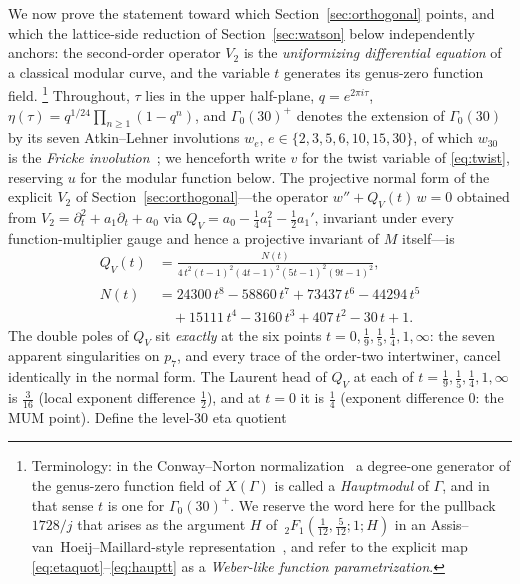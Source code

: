 \documentclass[cntp]{ipart}
\theoremstyle{plain}
\theoremstyle{remark}
\begin{document}
We now prove the statement toward which Section~\ref{sec:orthogonal} points, and which the lattice-side
reduction of Section~\ref{sec:watson} below independently anchors: the second-order
operator $V_2$ is the \emph{uniformizing differential equation} of a classical modular curve, and the variable
$t$ generates its genus-zero function field.%
\footnote{Terminology: in the Conway--Norton normalization~\cite{ConwayNorton1979} a degree-one generator of
the genus-zero function field of $X(\Gamma)$ is called a \emph{Hauptmodul} of $\Gamma$, and in that sense $t$
is one for $\Gamma_0(30)^+$. We reserve the word here for the pullback $1728/j$ that arises as the argument $H$
of $\,_2F_1\!\left(\tfrac1{12},\tfrac5{12};1;H\right)$ in an
Assis--van~Hoeij--Maillard-style representation~\cite{AVM2016}, and refer to the explicit
map \eqref{eq:etaquot}--\eqref{eq:hauptt} as a \emph{Weber-like function parametrization}.}
Throughout, $\tau$ lies in the upper half-plane, $q=e^{2\pi i\tau}$,
$\eta(\tau)=q^{1/24}\prod_{n\ge1}(1-q^n)$, and $\Gamma_0(30)^+$ denotes the extension of $\Gamma_0(30)$ by its
seven Atkin--Lehner involutions $w_e$, $e\in\{2,3,5,6,10,15,30\}$, of which $w_{30}$ is the \emph{Fricke
involution}~\cite{AtkinLehner1970,ConwayNorton1979}; we
henceforth write $v$ for the twist variable of \eqref{eq:twist}, reserving $u$ for the modular function
below. The projective normal form of the explicit $V_2$ of Section~\ref{sec:orthogonal}---the operator
$w''+Q_V(t)\,w=0$ obtained from $V_2=\partial_t^2+a_1\partial_t+a_0$ via
$Q_V=a_0-\tfrac14a_1^2-\tfrac12a_1'$, invariant under every function-multiplier gauge and hence a projective
invariant of $M$ itself---is
\begin{equation}
\begin{split}
Q_V(t)&=\frac{N(t)}{4\,t^2(t-1)^2(4t-1)^2(5t-1)^2(9t-1)^2},\\[2pt]
N(t)&=24300\,t^8-58860\,t^7+73437\,t^6-44294\,t^5\\
&\quad{}+15111\,t^4-3160\,t^3+407\,t^2-30\,t+1.
\end{split}
\label{eq:QV}
\end{equation}
The double poles of $Q_V$ sit \emph{exactly} at the six points $t=0,\tfrac19,\tfrac15,\tfrac14,1,\infty$: the
seven apparent singularities on $p_7$, and every trace of the order-two intertwiner, cancel identically in the
normal form. The Laurent head of $Q_V$ at each of $t=\tfrac19,\tfrac15,\tfrac14,1,\infty$ is $\tfrac3{16}$
(local exponent difference $\tfrac12$), and at $t=0$ it is $\tfrac14$ (exponent difference $0$: the MUM point).
Define the level-30 eta quotient
\end{document}
